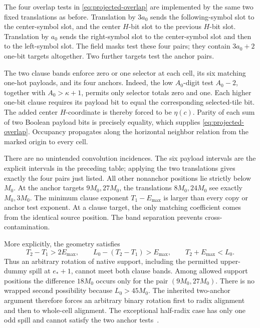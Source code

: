 The four overlap tests in \eqref{eq:projected-overlap} are implemented by
the same two fixed translations as before.  Translation by $3a_0$ sends
the following-symbol slot to the center-symbol slot, and the center
$H$-bit slot to the previous $H$-bit slot.  Translation by $a_0$ sends
the right-symbol slot to the center-symbol slot and then to the left-symbol
slot.  The field masks test these four pairs; they contain $3a_0+2$
one-bit targets altogether.  Two further targets test the anchor pairs.

The two clause bands enforce zero or one selector at each cell, its six
matching one-hot payloads, and its four anchors.  Indeed, the low
$A_0$-digit test $A_0-2$, together with $A_0>\kappa+1$, permits only
selector totals zero and one.  Each higher one-bit clause requires its
payload bit to equal the corresponding selected-tile bit.  The added
center $H$-coordinate is thereby forced to be $\eta(c)$.
Parity of each sum of two Boolean payload bits is precisely equality,
which supplies \eqref{eq:projected-overlap}.  Occupancy propagates along
the horizontal neighbor relation from the marked origin to every cell.

There are no unintended convolution incidences.  The six payload intervals
are the explicit intervals in the preceding table; applying the two
translations gives exactly the four pairs just listed.  All other
nonanchor positions lie strictly below $M_0$.  At the anchor targets
$9M_0,27M_0$, the translations $8M_0,24M_0$ see exactly $M_0,3M_0$.
The minimum clause exponent $T_1-E_{\max}$ is larger than every copy or
anchor test exponent.  At a clause target, the only matching coefficient
comes from the identical source position.  The band separation prevents
cross-contamination.

More explicitly, the geometry satisfies
\[
 T_2-T_1>2E_{\max},\qquad
 L_0-(T_2-T_1)>E_{\max},\qquad T_2+E_{\max}<L_0.
\]
Thus an arbitrary rotation of native support, including the permitted
upper-dummy spill at $e_*+1$, cannot meet both clause bands.
Among allowed support positions the difference $18M_0$ occurs only for
the pair $(9M_0,27M_0)$.  There is no wrapped second possibility because
$L_0>45M_0$.  The inherited two-anchor argument therefore forces an
arbitrary binary rotation first to radix alignment and then to whole-cell
alignment.  The exceptional half-radix case has only one odd spill and
cannot satisfy the two anchor tests~\cite{masks}.

